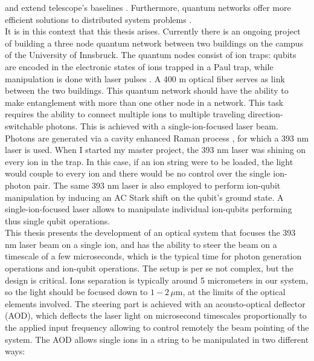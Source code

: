 \documentclass[english, a4paper, 12pt, twoside]{book}
\numberwithin{equation}{section} %
\begin{document}
and extend telescope's baselines \cite{telescope}. Furthermore, quantum networks offer more efficient solutions to distributed system problems \cite{distributedcomputing}.\\
It is in this context that this thesis arises. Currently there is an ongoing project of building a three node quantum network between two buildings on the campus of the University of Innsbruck. The quantum nodes consist of ion traps: qubits are encoded in the electronic states of ions trapped in a Paul trap, while manipulation is done with laser pulses \cite{ionquantumcomputer}. A 400 m optical fiber serves as link between the two buildings. This quantum network should have the ability to make entanglement with more than one other node in a network. This task requires the ability to connect multiple ions to multiple traveling direction-switchable photons. This is achieved with a single-ion-focused laser beam.\\ %
Photons are generated via a cavity enhanced Raman process \cite{stuteinterface}, for which a 393 nm laser is used. When I started my master project, the 393 nm laser was shining on every ion in the trap. In this case, if an ion string were to be loaded, the light would couple to every ion and there would be no control over the single ion-photon pair. The same 393 nm laser is also employed to perform ion-qubit manipulation by inducing an AC Stark shift on the qubit's ground state. A single-ion-focused laser allows to manipulate individual ion-qubits performing thus single qubit operations.\\
This thesis presents the development of an optical system that focuses the 393 nm laser beam on a single ion, and has the ability to steer the beam on a timescale of a few microseconds, which is the typical time for photon generation operations and ion-qubit operations. The setup is per se not complex, but the design is critical. Ions separation is typically around 5 micrometers in our system, so the light should be focused down to $1-2\,\mu$m, at the limits of the optical elements involved. The steering part is achieved with an acousto-optical deflector (AOD), which deflects the laser light on microsecond timescales proportionally to the applied input frequency allowing to control remotely the beam pointing of the system.
The AOD allows single ions in a string to be manipulated in two different ways:\textcolor{white}{The AOD allows single ions in a string to be manipulated
 }\vspace{-.5em}
\end{document}

